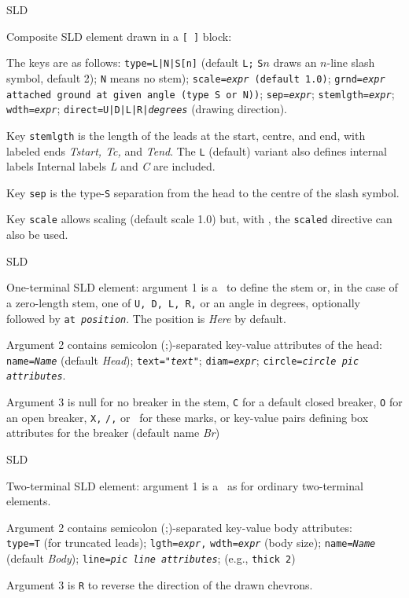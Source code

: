 %
  {SLD}%
  {Composite SLD element drawn in a {\tt [ ]} block:

   The keys are as follows:
   {\tt type=L|N|S[n]} (default {\tt L;} {\tt S$n$} draws an $n$-line slash
     symbol, default 2); {\tt N} means no stem);
   {\tt scale={\sl expr} (default 1.0)};
   {\tt grnd={\sl expr} attached ground at given angle
     (type {\tt S} or {\tt N}))};
   {\tt sep={\sl{}expr}};
   {\tt stemlgth={\sl{}expr}};
   {\tt wdth={\sl{}expr}};
   {\tt direct=U|D|L|R|{\sl degrees}} (drawing direction).

   Key {\tt stemlgth} is the length of the leads at the start, centre, and end,
     with labeled ends {\sl Tstart, Tc,} and {\sl Tend}.
     The {\tt L} (default) variant also defines internal labels
     Internal labels {\sl L} and {\sl C} are included.

   Key {\tt sep} is the type-{\tt S} separation from the head to the centre
     of the slash symbol.

   Key {\tt scale} allows scaling (default scale 1.0) but, with \dpic,
     the {\tt scaled} directive can also be used.
   }%
%
  {SLD}%
  {One-terminal SLD element: argument 1 is a \linespec\ to define the stem
   or, in the case of a zero-length stem, one of {\tt U, D, L, R,} or an
   angle in degrees, optionally followed by {\tt at {\sl position}}.
   The position is {\sl Here} by default.

   Argument 2 contains semicolon (;)-separated key-value attributes
   of the head:
   {\tt name={\sl{}Name}} (default {\sl Head});
   {\tt text="{\sl{}text}"};
   {\tt diam={\sl{}expr}};
   {\tt circle={\sl{}circle pic attributes}}.

   Argument 3 is null for no breaker in the stem, {\tt C} for a default
   closed breaker, {\tt O} for an open breaker, {\tt X,} {\tt /,} or \bsl\ for
   these marks, or
   key-value pairs defining box attributes for the breaker
   (default name {\sl Br})
   \label{sl_disk}
   }%
%
  {SLD}%
  {Two-terminal SLD element: argument 1 is a \linespec\ as for ordinary
   two-terminal elements.

   Argument 2 contains semicolon (;)-separated key-value body attributes:\\
   {\tt type=T} (for truncated leads);
   {\tt lgth={\sl{}expr},}
   {\tt wdth={\sl{}expr}} (body size);
   {\tt name={\sl{}Name}} (default {\sl Body});
   {\tt line={\sl{}pic line attributes}}; (e.g., {\tt thick 2})

   Argument 3 is {\tt R} to reverse the direction of the drawn chevrons.
   }%
